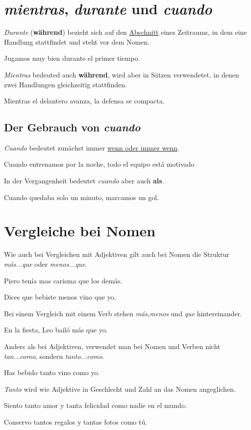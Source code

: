 \section{\textit{mientras}, \textit{durante} und \textit{cuando}}
\textit{Durante} (\textbf{während}) bezieht sich auf den \underline{Abschnitt}
eines Zeitraums, in dem eine Handlung stattfindet und steht 
vor dem Nomen.
\begin{ejemplos}
    \item Jugamos muy bien durante el primer tiempo.
\end{ejemplos}
\textit{Mientras} bedeuted auch \textbf{während}, wird aber 
in Sätzen verwendetet, in denen zwei Handlungen gleichzeitig 
stattfinden.
\begin{ejemplos}
    \item Mientras el delantero avanza, la defensa se compacta.
\end{ejemplos}
\subsection*{Der Gebrauch von \textit{cuando}}
\textit{Cuando} bedeutet zunächst immer \underline{wenn oder
immer wenn}.
\begin{ejemplos}
    \item Cuando entrenamos por la noche, todo el equipo
    est\'a motivado
\end{ejemplos}
In der Vergangenheit bedeutet \textit{cuando} aber auch \textbf{als}.
\begin{ejemplos}
    \item Cuando quedaba solo un minuto, marcamos un gol.
\end{ejemplos}
\section{Vergleiche bei Nomen} 
Wie auch bei Vergleichen mit Adjektiven gilt auch bei Nomen
die Struktur \textit{m\'as...que}  oder \textit{menos...que}.
\begin{ejemplos}
    \item Piero ten\'ia mas carisma que los dem\'as.
    \item Dices que bebiste menos vino que yo.
\end{ejemplos}  
Bei einem Vergleich mit einem Verb stehen \textit{m\'as,menos} 
und \textit{que} hintereinander.
\begin{ejemplos}
    \item En la fiesta, Leo bail\'o m\'as que yo.
\end{ejemplos}
Anders als bei Adjektiven, verwendet man bei Nomen und Verben
nicht \textit{tan...como}, sondern \textit{tanto...como}.
\begin{ejemplos}
    \item Has bebido tanto vino como yo.
\end{ejemplos}
\textit{Tanto} wird wie Adjektive in Geschlecht und Zahl an 
das Nomen angeglichen.
\begin{ejemplos}
    \item Siento tanto amor y tanta felicidad como nadie en el mundo.
    \item Conservo tantos regalos y tantas fotos como t\'u.
\end{ejemplos}